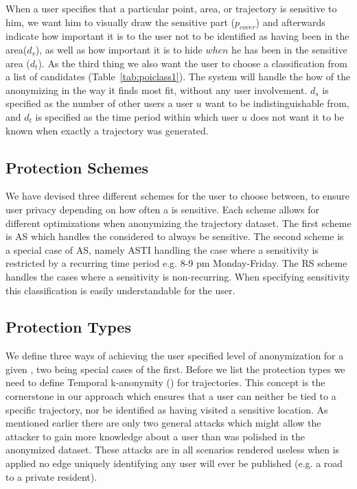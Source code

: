 When a user specifies that a particular point, area, or trajectory is sensitive to him, we want him to visually draw the sensitive part ($p_{cover}$) and afterwards indicate how important it is to the user not to be identified as having been in the area($d_s$), as well as how important it is to hide $when$ he has been in the sensitive area ($d_t$). As the third thing we also want the user to choose a classification from a list of candidates (Table~\ref{tab:poiclass1}). The system will handle the how of the anonymizing in the way it finds most fit, without any user involvement. $d_s$ is specified as the number of other users a user $u$ want to be indistinguishable from, and $d_t$ is specified as the time period within which user $u$ does not want it to be known when exactly a trajectory was generated.


\subsection{Protection Schemes}\label{subsec:schemes} %
We have devised three different schemes for the user to choose between, to ensure user privacy depending on how often a \poi is sensitive.  Each scheme allows for different optimizations when anonymizing the trajectory dataset. The first scheme is \ac{AS} which handles the \poi considered to always be sensitive. The second scheme is a special case of \ac{AS}, namely \ac{ASTI} handling the case where a \poi sensitivity is restricted by a recurring time period e.g. 8-9 pm Monday-Friday. The \ac{RS} scheme handles the cases where a \pois sensitivity is non-recurring. When specifying \poi sensitivity this classification is easily understandable for the user.


\subsection{Protection Types}\label{subsec:protectiontypes}

We define three ways of achieving the user specified level of anonymization for a given \poins, two being special cases of the first. Before we list the protection types we need to define Temporal k-anonymity (\tanonns) for trajectories. This concept is the cornerstone in our approach which ensures that a user can neither be tied to a specific trajectory, nor be identified as having visited a sensitive location. As mentioned earlier there are only two general attacks which might allow the attacker to gain more knowledge about a user than was polished in the anonymized dataset. These attacks are in all scenarios rendered useless when \tanon is applied no edge uniquely identifying any user will ever be published (e.g. a road to a private resident).




